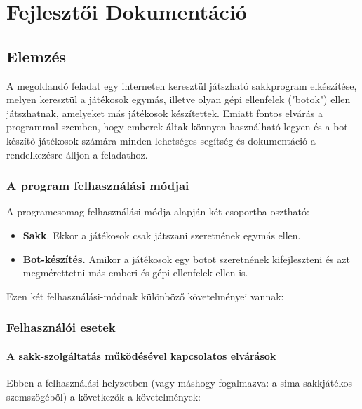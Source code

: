 \documentclass[twoside, a4paper, 12pt]{book}
\begin{document}
\part{Fejlesztői Dokumentáció}
\chapter{Elemzés}
A megoldandó feladat egy interneten keresztül játszható sakkprogram elkészítése, melyen keresztül a játékosok egymás, illetve olyan gépi ellenfelek ("botok") ellen játszhatnak, amelyeket más játékosok készítettek. Emiatt fontos elvárás a programmal szemben, hogy emberek áltak könnyen használható legyen és a bot-készítő játékosok számára minden lehetséges segítség és dokumentáció a rendelkezésre álljon a feladathoz.

\section{A program felhasználási módjai}
A programcsomag felhasználási módja alapján két csoportba osztható:
\begin{itemize}
	\item \textbf{Sakk}. Ekkor a játékosok csak játszani szeretnének egymás ellen.
	
	\item \textbf{Bot-készítés.} Amikor a játékosok egy botot szeretnének kifejleszteni és azt megmérettetni más emberi és gépi ellenfelek ellen is.
\end{itemize}

Ezen két felhasználási-módnak különböző követelményei vannak:

\section{Felhasználói esetek}
\subsection{A sakk-szolgáltatás működésével kapcsolatos elvárások}
Ebben a felhasználási helyzetben (vagy máshogy fogalmazva: a sima sakkjátékos szemszögéből) a következők a követelmények:
\end{document}

